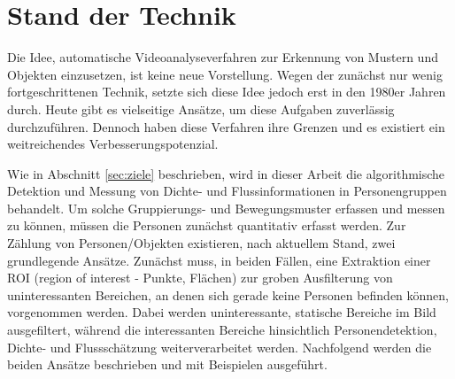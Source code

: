 \section{Stand der Technik}
\label{sec:std}

Die Idee, automatische Videoanalyseverfahren zur Erkennung von Mustern und Objekten einzusetzen, ist keine neue Vorstellung. Wegen der zunächst nur wenig fortgeschrittenen Technik, setzte sich diese Idee jedoch erst in den 1980er Jahren durch. Heute gibt es vielseitige Ansätze, um diese Aufgaben zuverlässig durchzuführen. Dennoch haben diese Verfahren ihre Grenzen und es existiert ein weitreichendes Verbesserungspotenzial.

Wie in Abschnitt \ref{sec:ziele} beschrieben, wird in dieser Arbeit die algorithmische Detektion und Messung von Dichte- und Flussinformationen in Personengruppen behandelt. Um solche Gruppierungs- und Bewegungsmuster erfassen und messen zu können, müssen die Personen zunächst quantitativ erfasst werden. Zur Zählung von Personen/Objekten existieren, nach aktuellem Stand, zwei grundlegende Ansätze. Zunächst muss, in beiden Fällen, eine Extraktion einer ROI (region of interest - \zb Punkte, Flächen) zur groben Ausfilterung von uninteressanten Bereichen, an denen sich gerade keine Personen befinden können, vorgenommen werden. Dabei werden uninteressante, statische Bereiche im Bild ausgefiltert, während die interessanten Bereiche hinsichtlich Personendetektion, Dichte- und Flussschätzung weiterverarbeitet werden. Nachfolgend werden die beiden Ansätze beschrieben und mit Beispielen ausgeführt.





